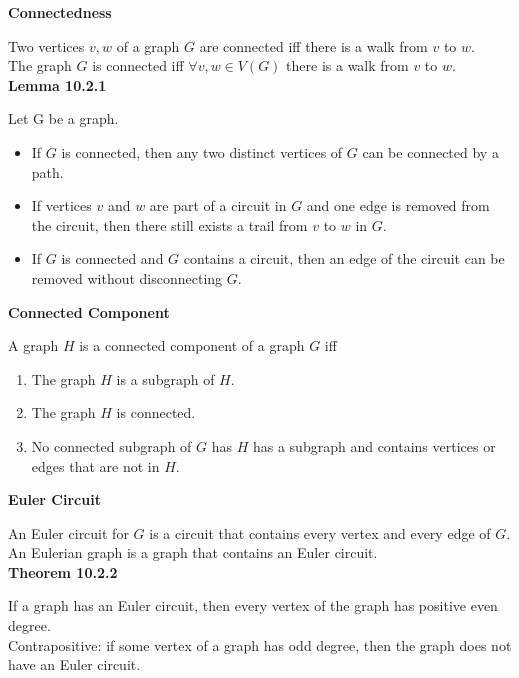 \documentclass[a4paper]{article}
\newcommand{\subheading}[1]{{\scriptsize\textbf{#1}}}
\begin{document}
\begin{multicols*}{4}
\subheading{Connectedness}

Two vertices $v, w$ of a graph $G$ are connected iff there is a walk from $v$ to
$w$.\\

The graph $G$ is connected iff $\forall v, w \in V(G)$ there is a walk from $v$
to $w$. \\

\subheading{Lemma 10.2.1}

Let G be a graph.
\begin{itemize}[leftmargin=*] \itemsep -0.5em
  \item If $G$ is connected, then any two distinct vertices of $G$ can be
    connected by a path.
  \item If vertices $v$ and $w$ are part of a circuit in $G$ and one edge is
    removed from the circuit, then there still exists a trail from $v$ to $w$ in
    $G$.
  \item If $G$ is connected and $G$ contains a circuit, then an edge of the
    circuit can be removed without disconnecting $G$.
\end{itemize}


\subheading{Connected Component}

A graph $H$ is a connected component of a graph $G$ iff
\begin{enumerate} \itemsep -0.5em
 \item The graph $H$ is a subgraph of $H$.
 \item The graph $H$ is connected.
 \item No connected subgraph of $G$ has $H$ has a subgraph and contains
   vertices or edges that are not in $H$.
\end{enumerate}

\subheading{Euler Circuit}

An Euler circuit for $G$ is a circuit that contains every vertex and every edge
of $G$. An Eulerian graph is a graph that contains an Euler circuit.\\

\subheading{Theorem 10.2.2}

If a graph has an Euler circuit, then every vertex of the graph has positive
even degree.\\

Contrapositive: if some vertex of a graph has odd degree, then the
graph does not have an Euler circuit.\\


\end{multicols*}
\end{document}
